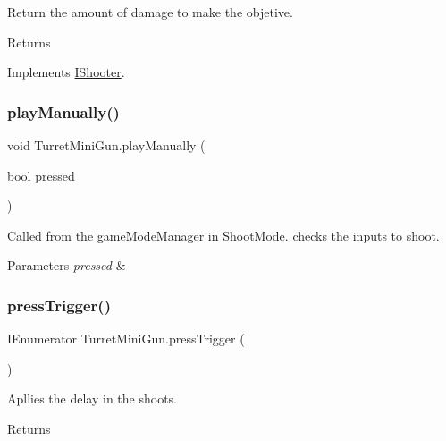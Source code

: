 Return the amount of damage to make the objetive. 

\begin{DoxyReturn}{Returns}

\end{DoxyReturn}


Implements \mbox{\hyperlink{interface_i_shooter}{I\+Shooter}}.

\mbox{\label{class_turret_mini_gun_a38e7de5216effbf5855e7e2f0fd27e08}} 
\subsubsection{\texorpdfstring{play\+Manually()}{playManually()}}
{\footnotesize\ttfamily void Turret\+Mini\+Gun.\+play\+Manually (\begin{DoxyParamCaption}\item[{bool}]{pressed }\end{DoxyParamCaption})}



Called from the game\+Mode\+Manager in \mbox{\hyperlink{class_shoot_mode}{Shoot\+Mode}}. checks the inputs to shoot. 


\begin{DoxyParams}{Parameters}
{\em pressed} & \\
\hline
\end{DoxyParams}
\mbox{\label{class_turret_mini_gun_a1fddb95fa87c0de06be43cfbc9e97c81}} 
\subsubsection{\texorpdfstring{press\+Trigger()}{pressTrigger()}}
{\footnotesize\ttfamily I\+Enumerator Turret\+Mini\+Gun.\+press\+Trigger (\begin{DoxyParamCaption}{ }\end{DoxyParamCaption})}



Apllies the delay in the shoots. 

\begin{DoxyReturn}{Returns}

\end{DoxyReturn}
\mbox{\label{class_turret_mini_gun_a8d975f5b522d64c92b69852af5c58db6}} 
